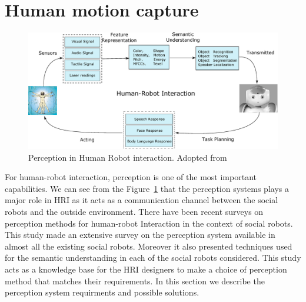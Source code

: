 \section{Human motion capture}
\label{sec:motion_capture}
\begin{figure}
\centering
\includegraphics[width=1\textwidth]{assets/hri_perception.eps}
\caption[Perception in Human Robot interaction]{Perception in Human Robot interaction. {Adopted from \cite{yan2014survey}}}
\label{fig:hri_perception}
\end{figure}
	For human-robot interaction, perception is one of the most important capabilities. We can see from the Figure~\ref{fig:hri_perception} that the perception systems plays a major role in HRI as it acts as a communication channel between the social robots and the outside environment. There have been recent surveys on perception methods for human-robot Interaction in the context of social robots\cite{yan2014survey}. This study made an extensive survey on the perception system available in almost all the existing social robots. Moreover it also presented techniques used for the semantic understanding in each of the social robots considered. This study acts as a knowledge base for the HRI designers to make a choice of perception method that matches their requirements. In this section we describe the perception system requirments and possible solutions.
